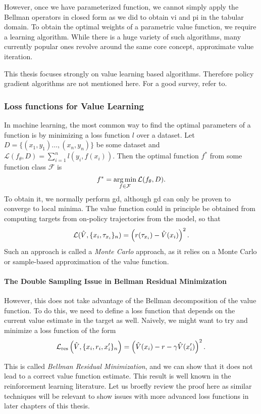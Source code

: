 However, once we have parameterized function, we cannot simply apply the Bellman operators in closed form as we did to obtain \ac{vi} and \ac{pi} in the tabular domain.
To obtain the optimal weights of a parametric value function, we require a learning algorithm.
While there is a huge variety of such algorithms, many currently popular ones revolve around the same core concept, approximate value iteration.

This thesis focuses strongly on value learning based algorithms.
Therefore policy gradient algorithms are not mentioned here.
For a good survey, refer to.

\subsubsection{Loss functions for Value Learning}

In machine learning, the most common way to find the optimal parameters of a function is by minimizing a loss function $l$ over a dataset.
Let $D = \{(x_1, y_1) \dots, (x_n, y_n)\}$ be some dataset and $\mathcal{L}(f_\theta,D) = \sum_{i=1}^n l(y_i, f(x_i))$.
Then the optimal function $f^*$ from some function class $\mathcal{F}$ is $$f^* = \operatorname*{arg\,min}_{f \in \mathcal{F}} \mathcal{L}(f_\theta,D).$$
To obtain it, we normally perform \ac{gd}, although \ac{gd} can only be proven to converge to local minima.
The value function could in principle be obtained from computing targets from on-policy trajectories from the model, so that $$\mathcal{L}(\hat{V}, \{x_i, \tau_{x_i}\}_n) = \left(r(\tau_{x_i}) - \hat{V}(x_i)\right)^2.$$
Such an approach is called a \emph{Monte Carlo} approach, as it relies on a Monte Carlo or sample-based approximation of the value function.

\paragraph{The Double Sampling Issue in Bellman Residual Minimization}
However, this does not take advantage of the Bellman decomposition of the value function.
To do this, we need to define a loss function that depends on the current value estimate in the target as well.
Naively, we might want to try and minimize a loss function of the form
$$\mathcal{L}_\mathrm{res}\left(\hat{V}, \{x_i, r_i, x'_i\}_{n}\right) = \left(\hat{V}(x_i) - r - \gamma \hat{V}(x'_i)\right)^2.$$

This is called \emph{Bellman Residual Minimization}, and we can show that it does not lead to a correct value function estimate.
This result is well known in the reinforcement learning literature.
Let us broefly review the proof here as similar techniques will be relevant to show issues with more advanced loss functions in later chapters of this thesis.


